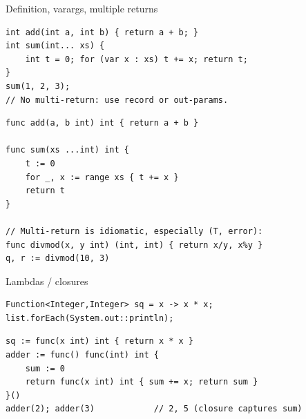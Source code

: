 \documentclass[10pt]{article}
\begin{document}
\begin{construct}{Definition, varargs, multiple returns}
\noindent
\begin{minipage}[t]{0.485\linewidth}
\begin{lstlisting}[style=java, title=Java]
int add(int a, int b) { return a + b; }
int sum(int... xs) {
    int t = 0; for (var x : xs) t += x; return t;
}
sum(1, 2, 3);
// No multi-return: use record or out-params.
\end{lstlisting}
\end{minipage}\hfill
\begin{minipage}[t]{0.485\linewidth}
\begin{lstlisting}[style=go, title=Go]
func add(a, b int) int { return a + b }

func sum(xs ...int) int {
    t := 0
    for _, x := range xs { t += x }
    return t
}

// Multi-return is idiomatic, especially (T, error):
func divmod(x, y int) (int, int) { return x/y, x%y }
q, r := divmod(10, 3)
\end{lstlisting}
\end{minipage}
\end{construct}

\begin{construct}{Lambdas / closures}
\noindent
\begin{minipage}[t]{0.485\linewidth}
\begin{lstlisting}[style=java, title=Java]
Function<Integer,Integer> sq = x -> x * x;
list.forEach(System.out::println);
\end{lstlisting}
\end{minipage}\hfill
\begin{minipage}[t]{0.485\linewidth}
\begin{lstlisting}[style=go, title=Go]
sq := func(x int) int { return x * x }
adder := func() func(int) int {
    sum := 0
    return func(x int) int { sum += x; return sum }
}()
adder(2); adder(3)            // 2, 5 (closure captures sum)
\end{lstlisting}
\end{minipage}
\end{construct}

\end{document}
